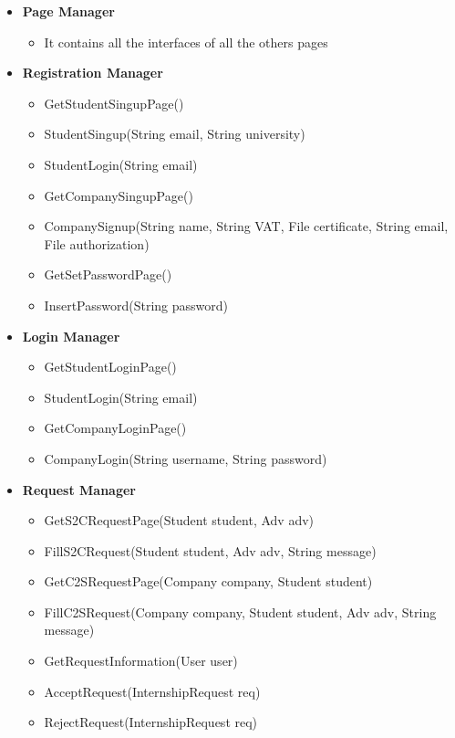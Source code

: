 \begin{itemize}
    \item \textbf{Page Manager}
        \begin{itemize}
            \item It contains all the interfaces of all the others pages
        \end{itemize}
        
    \item \textbf{Registration Manager}
        \begin{itemize}
            \item GetStudentSingupPage()
            \item StudentSingup(String email, String university)
            \item StudentLogin(String email)
            \item GetCompanySingupPage()
            \item CompanySignup(String name, String VAT, File certificate, String email, File authorization)
            \item GetSetPasswordPage()
            \item InsertPassword(String password)
        \end{itemize}
        
    \item \textbf{Login Manager}
        \begin{itemize}
            \item GetStudentLoginPage()
            \item StudentLogin(String email)
            \item GetCompanyLoginPage()
            \item CompanyLogin(String username, String password)
        \end{itemize}
        
    \item \textbf{Request Manager}
        \begin{itemize}
            \item GetS2CRequestPage(Student student, Adv adv)
            \item FillS2CRequest(Student student, Adv adv, String message)
            \item GetC2SRequestPage(Company company, Student student)
            \item FillC2SRequest(Company company, Student student, Adv adv, String message)
            \item GetRequestInformation(User user)
            \item AcceptRequest(InternshipRequest req)
            \item RejectRequest(InternshipRequest req)
        \end{itemize}
        

\end{itemize}
